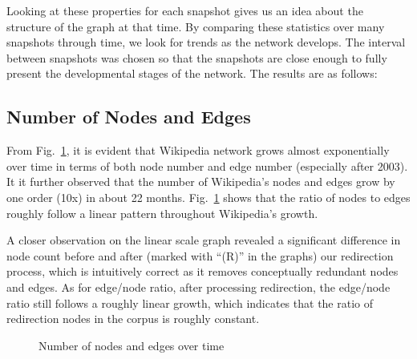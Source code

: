 \documentclass[10pt,twocolumn]{article}
\begin{document}
Looking at these properties for each snapshot gives us an idea about the structure of the graph at that time. By comparing these statistics over many snapshots through time, we look for trends as the network develops. The interval between snapshots was chosen so that the snapshots are close enough to fully present the developmental stages of the network. The results are as follows:

\subsection{Number of Nodes and Edges}
From Fig.~\ref{fig:growth}, it is evident that Wikipedia network grows almost exponentially over time in terms of both node number and edge number (especially after 2003). It it further observed that the number of Wikipedia's nodes and edges grow by one order (10x) in about 22 months. Fig.~\ref{fig:growth} shows that the ratio of nodes to edges roughly follow a linear pattern throughout Wikipedia's growth.

A closer observation on the linear scale graph revealed a significant difference in node count before and after (marked with ``(R)'' in the graphs) our redirection process, which is intuitively correct as it removes conceptually redundant nodes and edges. As for edge/node ratio, after processing redirection, the edge/node ratio still follows a roughly linear growth, which indicates that the ratio of redirection nodes in the corpus is roughly constant.

\begin{figure}
\caption{Number of nodes and edges over time \label{fig:growth}}
\end{figure}
\end{document}
